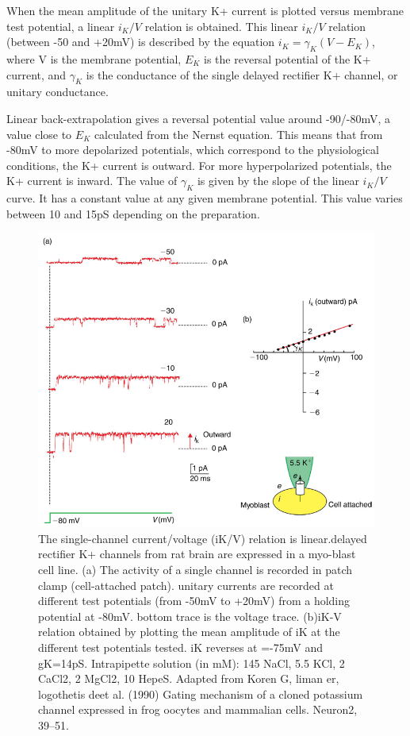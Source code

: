 \documentclass[../../Orator]{subfiles}
\begin{document}
When the mean amplitude of the unitary K+ current is plotted versus membrane test potential, a linear \(i_K/V\) relation is obtained.  This linear \(i_K/V\) relation (between -50 and +20mV) is described by the equation \(i_K = \gamma_K(V-E_K)\), where V is the membrane potential, \(E_K\) is the reversal potential of the K+ current, and \(\gamma_K\) is the conductance of the single delayed rectifier K+ channel, or unitary conductance. 

Linear back-extrapolation gives a reversal potential value around -90/-80mV, a value close to \(E_K\) calculated from the Nernst equation. This means that from -80mV to more depolarized potentials, which correspond to the physiological conditions, the K+ current is outward. For more hyperpolarized potentials, the K+ current is inward. The value of \(\gamma_K\) is given by the slope of the linear \(i_K/V\)curve. It has a constant value at any given membrane potential. This value varies between 10 and 15pS depending on the preparation. 

\begin{figure}[H]
     \centering
     \includegraphics[width=0.5\linewidth]{Pictures//Anakin/I-V.K.png}
     \caption{The single-channel current/voltage (iK/V) relation is linear.delayed rectifier K+ channels from rat brain are expressed in a myo-blast cell line. (a) The activity of a single channel is recorded in patch clamp (cell-attached patch). unitary currents are recorded at different test potentials (from -50mV to +20mV) from a holding potential at -80mV. bottom trace is the voltage trace. (b)iK-V relation obtained by plotting the mean amplitude of iK at the different test potentials tested. iK reverses at =-75mV and gK=14pS. Intrapipette solution (in mM): 145 NaCl, 5.5 KCl, 2 CaCl2, 2 MgCl2, 10 HepeS. Adapted from Koren G, liman er, logothetis deet al. (1990) Gating mechanism of a cloned potassium channel expressed in frog oocytes and mammalian cells. Neuron2, 39–51.}
     \label{fig:enter-label}
 \end{figure} 
\end{document}

